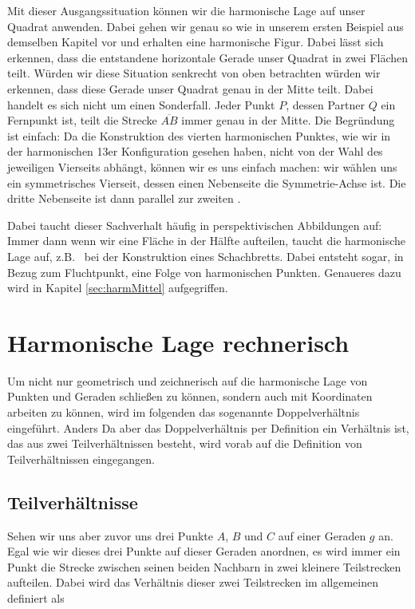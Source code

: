 \documentclass[12pt,a4paper]{article}
\begin{document}
Mit dieser Ausgangssituation können wir die harmonische Lage auf unser Quadrat anwenden. Dabei gehen wir genau so wie in unserem ersten Beispiel aus demselben Kapitel vor und erhalten eine harmonische Figur. Dabei lässt sich erkennen, dass die entstandene horizontale Gerade unser Quadrat in zwei Flächen teilt. Würden wir diese Situation senkrecht von oben betrachten würden wir erkennen, dass diese Gerade unser Quadrat genau in der Mitte teilt. Dabei handelt es sich nicht um einen Sonderfall. Jeder Punkt $P$, dessen Partner $Q$ ein Fernpunkt ist, teilt die Strecke $\overline{A B}$ immer genau in der Mitte.
\newline
Die Begründung ist einfach: Da die Konstruktion des vierten harmonischen Punktes, wie wir in der harmonischen 13er Konfiguration gesehen haben, nicht von der Wahl des jeweiligen Vierseits abhängt, können wir es uns einfach machen: wir wählen uns ein symmetrisches Vierseit, dessen einen Nebenseite die Symmetrie-Achse ist. Die dritte Nebenseite ist dann parallel zur zweiten \citep[vgl.~][S.~50]{projektiveGeometrie}.

Dabei taucht dieser Sachverhalt häufig in perspektivischen Abbildungen auf: Immer dann wenn wir eine Fläche in der Hälfte aufteilen, taucht die harmonische Lage auf, z.B.~ bei der Konstruktion eines Schachbretts. Dabei entsteht sogar, in Bezug zum Fluchtpunkt, eine Folge von harmonischen Punkten. Genaueres dazu wird in Kapitel \ref{sec:harmMittel} aufgegriffen.

\newpage
\section{Harmonische Lage rechnerisch}
Um nicht nur geometrisch und zeichnerisch auf die harmonische Lage von Punkten und Geraden schließen zu können, sondern auch mit Koordinaten arbeiten zu können, wird im folgenden das sogenannte Doppelverhältnis eingeführt. Anders Da aber das Doppelverhältnis per Definition ein Verhältnis ist, das aus zwei Teilverhältnissen besteht, wird vorab auf die Definition von Teilverhältnissen eingegangen.

\subsection{Teilverhältnisse}
Sehen wir uns aber zuvor uns drei Punkte $A$, $B$ und $C$ auf einer Geraden $g$ an. Egal wie wir dieses drei Punkte auf dieser Geraden anordnen, es wird immer ein Punkt die Strecke zwischen seinen beiden Nachbarn in zwei kleinere Teilstrecken aufteilen. Dabei wird das Verhältnis dieser zwei Teilstrecken im allgemeinen definiert als
\end{document}
